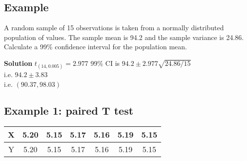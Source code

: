 
\subsection{Example}
A random sample of 15 observations is taken from a normally distributed population
of values. The sample mean is 94.2 and the sample variance is 24.86.
Calculate a 99\% confidence interval for the population mean.


\noindent \textbf{Solution}
$t_(14,0.005) = 2.977$
99\% CI is $94.2 \pm 2.977 \sqrt{24.86/15}$ \\i.e. $94.2 \pm 3.83$ \\i.e. $(90.37,98.03)$


\subsection{Example 1: paired T test}

\begin{center}
	\begin{tabular}{|c|c|c|c|c|c|c|}
		\hline
		X & 5.20 & 5.15 & 5.17 & 5.16 & 5.19 & 5.15\\ \hline 
		Y & 5.20 & 5.15 & 5.17 & 5.16 & 5.19 & 5.15\\
		\hline
	\end{tabular}
\end{center}